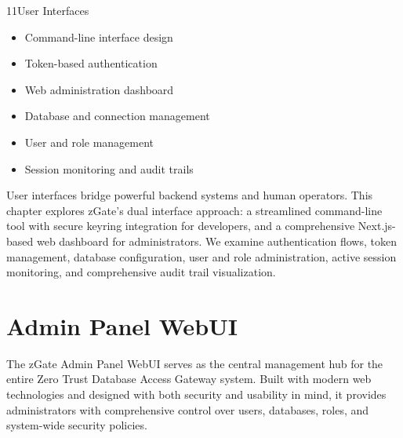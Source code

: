 
\begin{sectionintro}{11}{User Interfaces}{
  \begin{itemize}[leftmargin=1.5em]
    \item Command-line interface design
    \item Token-based authentication
    \item Web administration dashboard
    \item Database and connection management
    \item User and role management
    \item Session monitoring and audit trails
  \end{itemize}
}
User interfaces bridge powerful backend systems and human operators. This chapter explores zGate's dual interface approach: a streamlined command-line tool with secure keyring integration for developers, and a comprehensive Next.js-based web dashboard for administrators. We examine authentication flows, token management, database configuration, user and role administration, active session monitoring, and comprehensive audit trail visualization.
\end{sectionintro}


\section{Admin Panel WebUI}

The zGate Admin Panel WebUI serves as the central management hub for the entire Zero Trust Database Access Gateway system. Built with modern web technologies and designed with both security and usability in mind, it provides administrators with comprehensive control over users, databases, roles, and system-wide security policies.

